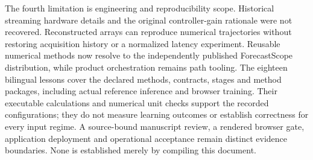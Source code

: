 The fourth limitation is engineering and reproducibility scope. Historical streaming hardware details and the original controller-gain rationale were not recovered. Reconstructed arrays can reproduce numerical trajectories without restoring acquisition history or a normalized latency experiment. Reusable numerical methods now resolve to the independently published ForecastScope distribution, while product orchestration remains path tooling. The eighteen bilingual lessons cover the declared methods, contracts, stages and method packages, including actual reference inference and browser training. Their executable calculations and numerical unit checks support the recorded configurations; they do not measure learning outcomes or establish correctness for every input regime. A source-bound manuscript review, a rendered browser gate, application deployment and operational acceptance remain distinct evidence boundaries. None is established merely by compiling this document.


